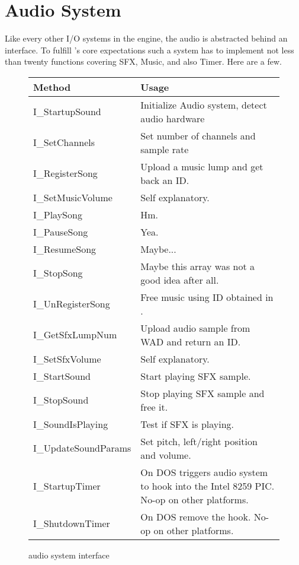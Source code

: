 \section{Audio System}
\label{dmx_section}
Like every other I/O systems in the engine, the audio is abstracted behind an interface. To fulfill \doom's core expectations such a system has to implement not less than twenty functions covering SFX, Music, and also Timer. Here are a few.\\
\par
 \begin{figure}[H]
\centering  
\begin{tabularx}{\textwidth}{ L{0.6}  L{1.4}}
  \toprule
  \textbf{Method} &  \textbf{Usage}\\

  \toprule 
  I\_StartupSound & Initialize Audio system, detect audio hardware\\
  I\_SetChannels & Set number of channels and sample rate\\
  \toprule 
   
I\_RegisterSong & Upload a music lump and get back an ID.\\
I\_SetMusicVolume & Self explanatory.\\
I\_PlaySong & Hm.\\
I\_PauseSong & Yea.\\
I\_ResumeSong & Maybe...\\
I\_StopSong & Maybe this array was not a good idea after all.\\
I\_UnRegisterSong & Free music using ID obtained in .\\




  \toprule 
I\_GetSfxLumpNum & Upload audio sample from WAD and return an ID.\\
I\_SetSfxVolume & Self explanatory.\\
I\_StartSound & Start playing SFX sample.\\
I\_StopSound & Stop playing SFX sample and free it.\\
I\_SoundIsPlaying & Test if SFX is playing.\\
I\_UpdateSoundParams & Set pitch, left/right position and volume.\\

  \toprule 
  
I\_StartupTimer & On DOS triggers audio system to hook into the Intel 8259 PIC. No-op on other platforms.\\
I\_ShutdownTimer & On DOS remove the hook.  No-op on other platforms.\\

   \toprule
\end{tabularx}
\caption{\doom{} audio system interface}
\end{figure}



